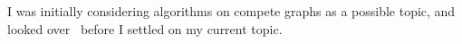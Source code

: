\documentclass{sig-alternate}
\begin{document}
I was initially considering algorithms on compete graphs as a possible topic, and looked over~\cite{winkler1984isometric, dobkin1987delaunay, folkman1970graphs} before I settled on my current topic.


  

\end{document}
